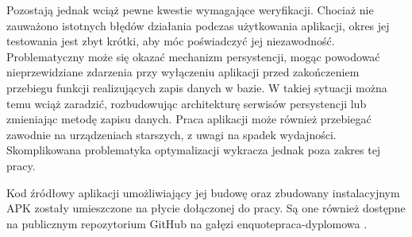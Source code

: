 \documentclass[12pt]{article}
\begin{document}
Pozostają jednak wciąż pewne kwestie wymagające weryfikacji. Chociaż nie zauważono istotnych błędów działania podczas użytkowania aplikacji,
okres jej testowania jest zbyt krótki, aby móc poświadczyć jej niezawodność.
Problematyczny może się okazać mechanizm persystencji,
mogąc powodować nieprzewidziane zdarzenia przy wyłączeniu aplikacji przed zakończeniem przebiegu funkcji realizujących zapis danych w bazie.
W takiej sytuacji można temu wciąż zaradzić, rozbudowując architekturę serwisów persystencji lub zmieniając metodę zapisu danych.
Praca aplikacji może również przebiegać zawodnie na urządzeniach starszych, z uwagi na spadek wydajności. Skomplikowana problematyka
optymalizacji wykracza jednak poza zakres tej pracy.

Kod źródłowy aplikacji umożliwiający jej budowę oraz zbudowany instalacyjnym APK zostały umieszczone na płycie dołączonej do pracy.
Są one również dostępne na publicznym repozytorium GitHub na gałęzi enquote{praca-dyplomowa} \cite{source}.

\newpage
{}
\printbibliography

\listoffigures

\listoftables
\end{document}
